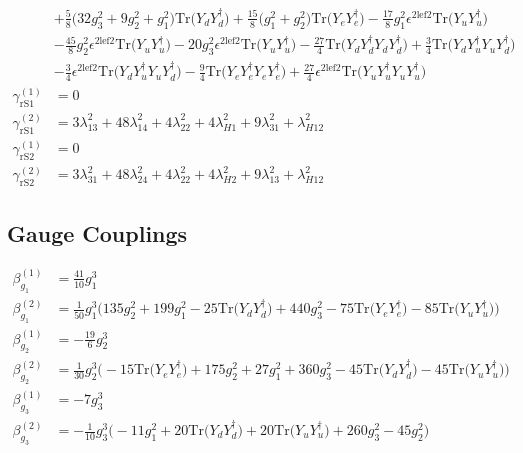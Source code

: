 {\begin{align}
 &+\frac{5}{8} \Big(32 g_{3}^{2}  + 9 g_{2}^{2}  + g_{1}^{2}\Big)\mbox{Tr}\Big({Y_d  Y_{d}^{\dagger}}\Big) +\frac{15}{8} \Big(g_{1}^{2} + g_{2}^{2}\Big)\mbox{Tr}\Big({Y_e  Y_{e}^{\dagger}}\Big) -\frac{17}{8} g_{1}^{2} \epsilon^{{2 \text{lef2}}} \mbox{Tr}\Big({Y_u  Y_{u}^{\dagger}}\Big) \nonumber \\ 
 &-\frac{45}{8} g_{2}^{2} \epsilon^{{2 \text{lef2}}} \mbox{Tr}\Big({Y_u  Y_{u}^{\dagger}}\Big) -20 g_{3}^{2} \epsilon^{{2 \text{lef2}}} \mbox{Tr}\Big({Y_u  Y_{u}^{\dagger}}\Big) -\frac{27}{4} \mbox{Tr}\Big({Y_d  Y_{d}^{\dagger}  Y_d  Y_{d}^{\dagger}}\Big) +\frac{3}{4} \mbox{Tr}\Big({Y_d  Y_{u}^{\dagger}  Y_u  Y_{d}^{\dagger}}\Big) \nonumber \\ 
 &-\frac{3}{4} \epsilon^{{2 \text{lef2}}} \mbox{Tr}\Big({Y_d  Y_{u}^{\dagger}  Y_u  Y_{d}^{\dagger}}\Big) -\frac{9}{4} \mbox{Tr}\Big({Y_e  Y_{e}^{\dagger}  Y_e  Y_{e}^{\dagger}}\Big) +\frac{27}{4} \epsilon^{{2 \text{lef2}}} \mbox{Tr}\Big({Y_u  Y_{u}^{\dagger}  Y_u  Y_{u}^{\dagger}}\Big) \\ 
\gamma_{\text{rS1}}^{(1)} & =  
0\\ 
\gamma_{\text{rS1}}^{(2)} & =  
3 \lambda_{13}^{2}  + 48 \lambda_{14}^{2}  + 4 \lambda_{22}^{2}  + 4 \lambda_{H1}^{2}  + 9 \lambda_{31}^{2}  + \lambda_{H12}^{2}\\ 
\gamma_{\text{rS2}}^{(1)} & =  
0\\ 
\gamma_{\text{rS2}}^{(2)} & =  
3 \lambda_{31}^{2}  + 48 \lambda_{24}^{2}  + 4 \lambda_{22}^{2}  + 4 \lambda_{H2}^{2}  + 9 \lambda_{13}^{2}  + \lambda_{H12}^{2}
\end{align} } 
\subsection{Gauge Couplings}
{\allowdisplaybreaks  \begin{align} 
\beta_{g_1}^{(1)} & =  
\frac{41}{10} g_{1}^{3} \\ 
\beta_{g_1}^{(2)} & =  
\frac{1}{50} g_{1}^{3} \Big(135 g_{2}^{2}  + 199 g_{1}^{2}  -25 \mbox{Tr}\Big({Y_d  Y_{d}^{\dagger}}\Big)  + 440 g_{3}^{2}  -75 \mbox{Tr}\Big({Y_e  Y_{e}^{\dagger}}\Big)  -85 \mbox{Tr}\Big({Y_u  Y_{u}^{\dagger}}\Big) \Big)\\ 
\beta_{g_2}^{(1)} & =  
-\frac{19}{6} g_{2}^{3} \\ 
\beta_{g_2}^{(2)} & =  
\frac{1}{30} g_{2}^{3} \Big(-15 \mbox{Tr}\Big({Y_e  Y_{e}^{\dagger}}\Big)  + 175 g_{2}^{2}  + 27 g_{1}^{2}  + 360 g_{3}^{2}  -45 \mbox{Tr}\Big({Y_d  Y_{d}^{\dagger}}\Big)  -45 \mbox{Tr}\Big({Y_u  Y_{u}^{\dagger}}\Big) \Big)\\ 
\beta_{g_3}^{(1)} & =  
-7 g_{3}^{3} \\ 
\beta_{g_3}^{(2)} & =  
-\frac{1}{10} g_{3}^{3} \Big(-11 g_{1}^{2}  + 20 \mbox{Tr}\Big({Y_d  Y_{d}^{\dagger}}\Big)  + 20 \mbox{Tr}\Big({Y_u  Y_{u}^{\dagger}}\Big)  + 260 g_{3}^{2}  -45 g_{2}^{2} \Big)
\end{align}} 
